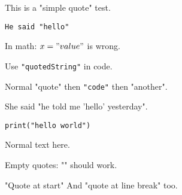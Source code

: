 This is a "simple quote" test.

\begin{verbatim}
He said "hello"
\end{verbatim}

In math: $x = "value"$ is wrong.

Use \texttt{"quotedString"} in code.

Normal "quote" then \texttt{"code"} then "another".

She said "he told me 'hello' yesterday".

\begin{lstlisting}
print("hello world")
\end{lstlisting}

Normal text here.

Empty quotes: "" should work.

"Quote at start"
And "quote
at line break" too.

